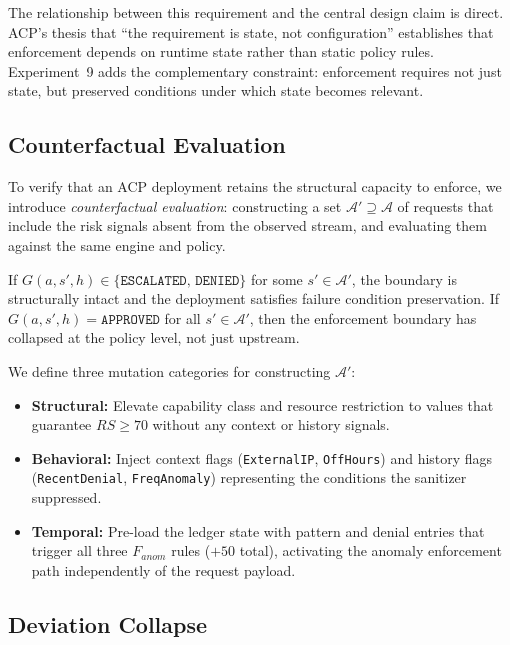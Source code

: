 \documentclass[11pt]{article}
\theoremstyle{definition}
\begin{document}
The relationship between this requirement and the central design claim is direct.
ACP's thesis that ``the requirement is state, not configuration'' establishes that
enforcement depends on runtime state rather than static policy rules.
Experiment~9 adds the complementary constraint: enforcement requires not just state,
but preserved conditions under which state becomes relevant.

\subsection{Counterfactual Evaluation}
\label{sec:counterfactual}

To verify that an ACP deployment retains the structural capacity to enforce,
we introduce \emph{counterfactual evaluation}: constructing a set
$\mathcal{A}' \supseteq \mathcal{A}$ of requests that include the risk signals
absent from the observed stream, and evaluating them against the same engine
and policy.

If $G(a, s', h) \in \{\texttt{ESCALATED},\,\texttt{DENIED}\}$ for some
$s' \in \mathcal{A}'$, the boundary is structurally intact and the
deployment satisfies failure condition preservation.
If $G(a, s', h) = \texttt{APPROVED}$ for all $s' \in \mathcal{A}'$, then
the enforcement boundary has collapsed at the policy level, not just upstream.

We define three mutation categories for constructing $\mathcal{A}'$:

\begin{itemize}[noitemsep]
  \item \textbf{Structural:} Elevate capability class and resource restriction to
    values that guarantee $\mathit{RS} \geq 70$ without any context or history signals.
  \item \textbf{Behavioral:} Inject context flags (\texttt{ExternalIP}, \texttt{OffHours})
    and history flags (\texttt{RecentDenial}, \texttt{FreqAnomaly}) representing
    the conditions the sanitizer suppressed.
  \item \textbf{Temporal:} Pre-load the ledger state with pattern and denial entries
    that trigger all three $F_{\mathit{anom}}$ rules ($+50$ total), activating
    the anomaly enforcement path independently of the request payload.
\end{itemize}

\subsection{Deviation Collapse}
\end{document}
